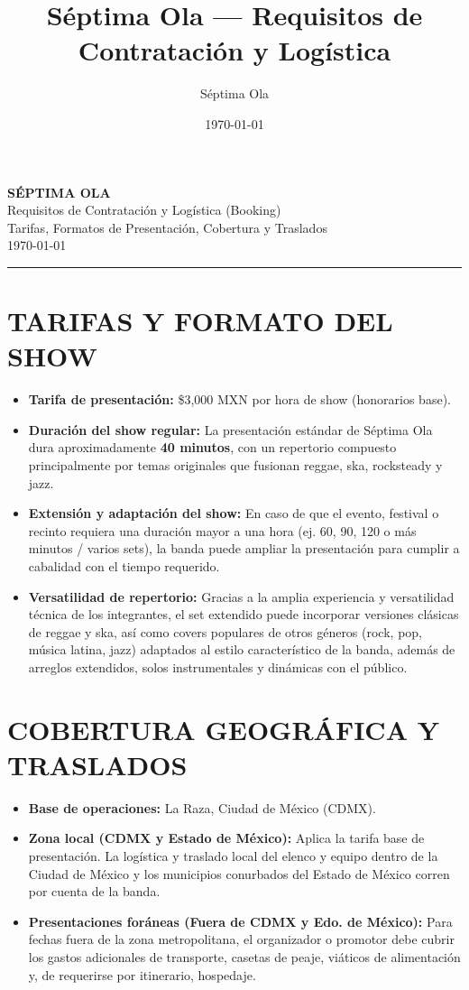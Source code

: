 \documentclass[a4paper,11pt]{article}
\title{Séptima Ola --- Requisitos de Contratación y Logística}
\author{Séptima Ola}
\date{\today}
\newcommand{\sect}[1]{\vspace{0.4em}\section*{\normalfont\large\bfseries\MakeUppercase{#1}}\vspace{-0.2em}}
\begin{document}
\begin{center}
    {\LARGE\bfseries SÉPTIMA OLA}\\[0.25em]
    {\Large Requisitos de Contratación y Logística (Booking)}\\[0.15em]
    {\small Tarifas, Formatos de Presentación, Cobertura y Traslados}\\[0.3em]
    {\small \today}
\end{center}

\vspace{0.2em}
\hrule
\vspace{0.5em}

\sect{Tarifas y Formato del Show}

\begin{itemize}[leftmargin=1.4em, itemsep=0.2em]
    \item \textbf{Tarifa de presentación:} \$3,000 MXN por hora de show (honorarios base).
    \item \textbf{Duración del show regular:} La presentación estándar de Séptima Ola dura aproximadamente \textbf{40 minutos}, con un repertorio compuesto principalmente por temas originales que fusionan reggae, ska, rocksteady y jazz.
    \item \textbf{Extensión y adaptación del show:} En caso de que el evento, festival o recinto requiera una duración mayor a una hora (ej. 60, 90, 120 o más minutos / varios sets), la banda puede ampliar la presentación para cumplir a cabalidad con el tiempo requerido.
    \item \textbf{Versatilidad de repertorio:} Gracias a la amplia experiencia y versatilidad técnica de los integrantes, el set extendido puede incorporar versiones clásicas de reggae y ska, así como covers populares de otros géneros (rock, pop, música latina, jazz) adaptados al estilo característico de la banda, además de arreglos extendidos, solos instrumentales y dinámicas con el público.
\end{itemize}

\sect{Cobertura Geográfica y Traslados}

\begin{itemize}[leftmargin=1.4em, itemsep=0.2em]
    \item \textbf{Base de operaciones:} La Raza, Ciudad de México (CDMX).
    \item \textbf{Zona local (CDMX y Estado de México):} Aplica la tarifa base de presentación. La logística y traslado local del elenco y equipo dentro de la Ciudad de México y los municipios conurbados del Estado de México corren por cuenta de la banda.
    \item \textbf{Presentaciones foráneas (Fuera de CDMX y Edo. de México):} Para fechas fuera de la zona metropolitana, el organizador o promotor debe cubrir los gastos adicionales de transporte, casetas de peaje, viáticos de alimentación y, de requerirse por itinerario, hospedaje.
\end{itemize}
\end{document}
